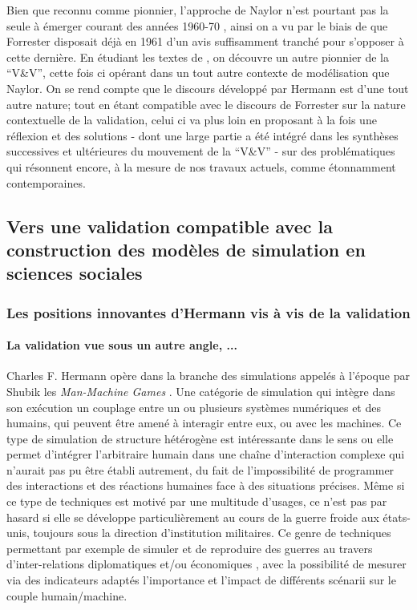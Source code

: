Bien que reconnu comme pionnier, l'approche de Naylor n'est pourtant pas la seule à émerger courant des années 1960-70 \autocite{Balci1980}, ainsi on a vu par le biais de \autocite{Barlas1990} que Forrester disposait déjà en 1961 d'un avis suffisamment tranché pour s'opposer à cette dernière. En étudiant les textes de \textcite{Hermann1967}, on découvre un autre pionnier de la \enquote{V\&V}, cette fois ci opérant dans un tout autre contexte de modélisation que Naylor. On se rend compte que le discours développé par Hermann est d'une tout autre nature; tout en étant compatible avec le discours de Forrester sur la nature contextuelle de la validation, celui ci va plus loin en proposant à la fois une réflexion et des solutions - dont une large partie a été intégré dans les synthèses successives et ultérieures du mouvement de la \enquote{V\&V} - sur des problématiques qui résonnent encore, à la mesure de nos travaux actuels, comme étonnamment contemporaines.

\subsection{Vers une validation compatible avec la construction des modèles de simulation en sciences sociales}
\label{ssec:validation_compatible_shs}

\subsubsection{Les positions innovantes d'Hermann vis à vis de la validation}
\label{sssec:position_hermann}

\paragraph{La validation vue sous un autre angle, ...}

Charles F. Hermann opère dans la branche des simulations appelés à l'époque par Shubik les \textit{Man-Machine Games} \autocite{Shubik1972}. Une catégorie de simulation qui intègre dans son exécution un couplage entre un ou plusieurs systèmes numériques et des humains, qui peuvent être amené à interagir entre eux, ou avec les machines. Ce type de simulation de structure hétérogène est intéressante dans le sens ou elle permet d'intégrer l'arbitraire humain dans une chaîne d'interaction complexe qui n'aurait pas pu être établi autrement, du fait de l'impossibilité de programmer des interactions et des réactions humaines face à des situations précises. Même si ce type de techniques est motivé par une multitude d'usages, ce n'est pas par hasard si elle se développe particulièrement au cours de la guerre froide aux états-unis, toujours sous la direction d'institution militaires. Ce genre de techniques permettant par exemple de simuler et de reproduire des guerres au travers d'inter-relations diplomatiques et/ou économiques \autocite{Hermann1967b}, avec la possibilité de mesurer via des indicateurs adaptés l'importance et l'impact de différents scénarii sur le couple humain/machine.

